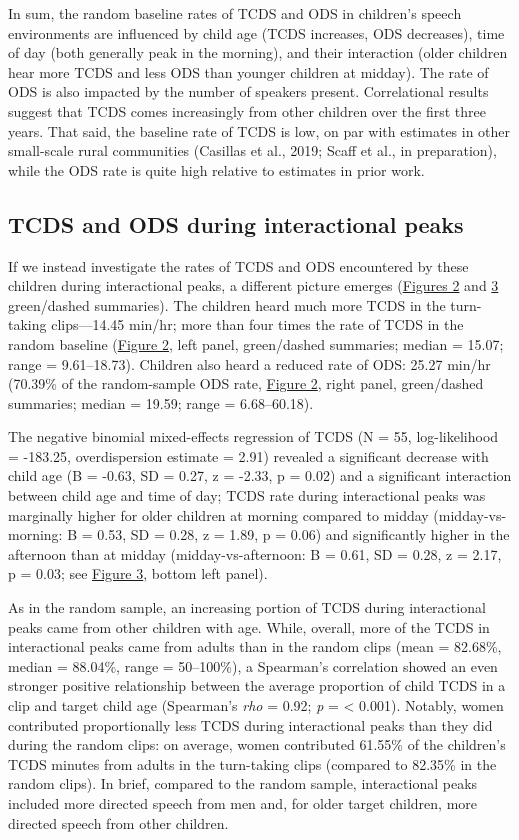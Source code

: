 \documentclass[,man,floatsintext]{apa6}
\begin{document}
In sum, the random baseline rates of TCDS and ODS in children's speech
environments are influenced by child age (TCDS increases, ODS
decreases), time of day (both generally peak in the morning), and their
interaction (older children hear more TCDS and less ODS than younger
children at midday). The rate of ODS is also impacted by the number of
speakers present. Correlational results suggest that TCDS comes
increasingly from other children over the first three years. That said,
the baseline rate of TCDS is low, on par with estimates in other
small-scale rural communities (Casillas et al., 2019; Scaff et al., in
preparation), while the ODS rate is quite high relative to estimates in
prior work.

\subsection{TCDS and ODS during interactional
peaks}\label{tcds-and-ods-during-interactional-peaks}

If we instead investigate the rates of TCDS and ODS encountered by these
children during interactional peaks, a different picture emerges
(\protect\hyperlink{fig2}{Figures 2} and \protect\hyperlink{fig3}{3}
green/dashed summaries). The children heard much more TCDS in the
turn-taking clips---14.45 min/hr; more than four times the rate of TCDS
in the random baseline (\protect\hyperlink{fig2}{Figure 2}, left panel,
green/dashed summaries; median = 15.07; range = 9.61--18.73). Children
also heard a reduced rate of ODS: 25.27 min/hr (70.39\% of the
random-sample ODS rate, \protect\hyperlink{fig2}{Figure 2}, right panel,
green/dashed summaries; median = 19.59; range = 6.68--60.18).

The negative binomial mixed-effects regression of TCDS (N = 55,
log-likelihood = -183.25, overdispersion estimate = 2.91) revealed a
significant decrease with child age (B = -0.63, SD = 0.27, z = -2.33, p
= 0.02) and a significant interaction between child age and time of day;
TCDS rate during interactional peaks was marginally higher for older
children at morning compared to midday (midday-vs-morning: B = 0.53, SD
= 0.28, z = 1.89, p = 0.06) and significantly higher in the afternoon
than at midday (midday-vs-afternoon: B = 0.61, SD = 0.28, z = 2.17, p =
0.03; see \protect\hyperlink{fig3}{Figure 3}, bottom left panel).

As in the random sample, an increasing portion of TCDS during
interactional peaks came from other children with age. While, overall,
more of the TCDS in interactional peaks came from adults than in the
random clips (mean = 82.68\%, median = 88.04\%, range = 50--100\%), a
Spearman's correlation showed an even stronger positive relationship
between the average proportion of child TCDS in a clip and target child
age (Spearman's \emph{rho} = 0.92; \emph{p} = \textless{} 0.001).
Notably, women contributed proportionally less TCDS during interactional
peaks than they did during the random clips: on average, women
contributed 61.55\% of the children's TCDS minutes from adults in the
turn-taking clips (compared to 82.35\% in the random clips). In brief,
compared to the random sample, interactional peaks included more
directed speech from men and, for older target children, more directed
speech from other children.
\end{document}
